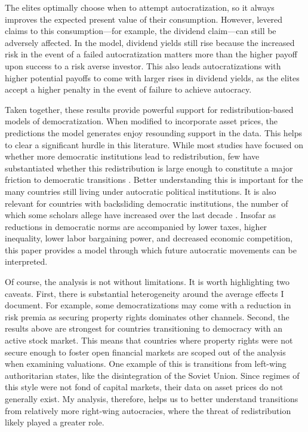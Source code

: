 \documentclass[12pt]{article}
\numberwithin{equation}{section}
\begin{document}
The elites optimally choose when to attempt autocratization, so it always improves the expected present value of their consumption. However, levered claims to this consumption---for example, the dividend claim---can still be adversely affected. In the model, dividend yields still rise because the increased risk in the event of a failed autocratization matters more than the higher payoff upon success to a risk averse investor. This also leads autocratizations with higher potential payoffs to come with larger rises in dividend yields, as the elites accept a higher penalty in the event of failure to achieve autocracy.

Taken together, these results provide powerful support for redistribution-based models of democratization. When modified to incorporate asset prices, the predictions the model generates enjoy resounding support in the data.  This helps to clear a significant hurdle in this literature. While most studies have focused on whether more democratic institutions lead to redistribution, few have substantiated whether this redistribution is large enough to constitute a major friction to democratic transitions \citep{Boix2003,Hinnerich2014,Acemoglu2015}. Better understanding this is important for the many countries still living under autocratic political institutions. It is also relevant for countries with backsliding democratic institutions, the number of which some scholars allege have increased over the last decade \citep{Diamond2015}. Insofar as reductions in democratic norms are accompanied by lower taxes, higher inequality, lower labor bargaining power, and decreased economic competition, this paper provides a model through which future autocratic movements can be interpreted.

\label{par:limitation_acknowledge_beg}
Of course, the analysis is not without limitations. It is worth highlighting two caveats. First, there is substantial heterogeneity around the average effects I document. For example, some democratizations may come with a reduction in risk premia as securing property rights dominates other channels. Second, the results above are strongest for countries transitioning to democracy with an active stock market.  This means that countries where property rights were not secure enough to foster open financial markets are scoped out of the analysis when examining valuations. One example of this is transitions from left-wing authoritarian states, like the disintegration of the Soviet Union. Since regimes of this style were not fond of capital markets, their data on asset prices do not generally exist. My analysis, therefore, helps us to better understand transitions from relatively more right-wing autocracies, where the threat of redistribution likely played a greater role.
\end{document}
